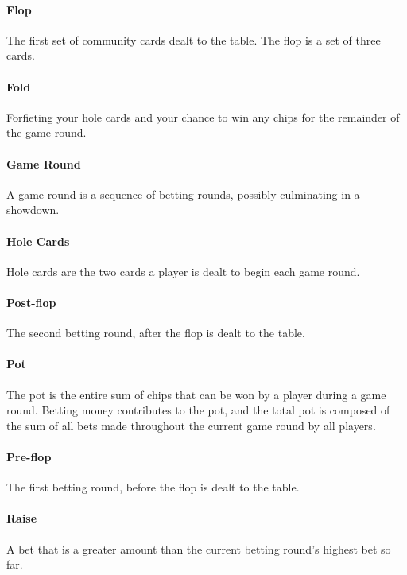 \paragraph*{Flop} The first set of community cards dealt to the table. The flop is a set of three cards.

\paragraph*{Fold} Forfieting your hole cards and your chance to win any chips for the remainder of the game round.

\paragraph*{Game Round} A game round is a sequence of betting rounds, possibly culminating in a showdown.
 
\paragraph*{Hole Cards} Hole cards are the two cards a player is dealt to begin each game round.
 
\paragraph*{Post-flop} The second betting round, after the flop is dealt to the table.

\paragraph*{Pot} The pot is the entire sum of chips that can be won by a player during a game round. Betting money contributes to the pot, and the total pot is composed of the sum of all bets made throughout the current game round by all players.
 
\paragraph*{Pre-flop} The first betting round, before the flop is dealt to the table.
 
\paragraph*{Raise} A bet that is a greater amount than the current betting round's highest bet so far.

